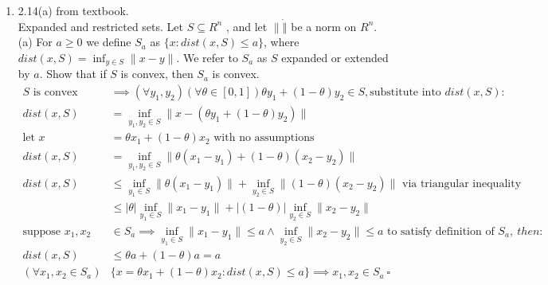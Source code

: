 \documentclass[12pt,letter]{article}
\newcommand{\norm}[1]{\|#1\|}
\newcommand{\set}[1]{\{#1\}}
\begin{document}
\begin{enumerate}
\item 2.14(a) from textbook.\\
  Expanded and restricted sets. Let $S \subseteq R^n$ , and let $\norm{\dot}$ be a norm on $R^n$.\\
  (a) For $a \geq 0$ we define $S_a$ as $\{x : dist(x, S) \leq a\}$, where $dist(x, S) = \inf_{y\in S} \norm{x-y}$. We refer to $S_a$ as $S$ expanded or extended by $a$. Show that if $S$ is convex, then $S_a$ is convex.
  \begin{align*}
    S \text{ is convex} &\implies (\forall y_1, y_2) (\forall \theta \in [0,1]) \theta y_1 + (1-\theta) y_2 \in S, \text{substitute into }dist(x,S):\\
    dist(x,S) &= \inf_{y_1,y_2 \in S} \norm{x-(\theta y_1 + (1-\theta) y_2)}\\
    \text{let } x &= \theta x_1 + (1-\theta) x_2 \text{ with no assumptions}\\
    dist(x,S) &= \inf_{y_1,y_2 \in S} \norm{\theta(x_1-y_1) + (1-\theta)(x_2-y_2)}\\
    dist(x,S) &\leq \inf_{y_1\in S}\norm{\theta(x_1-y_1)} + \inf_{y_2 \in S}\norm{(1-\theta)(x_2-y_2)} \text{ via triangular inequality}\\
                        &\leq |\theta| \inf_{y_1\in S}\norm{x_1-y_1} + |(1-\theta)|\inf_{y_2 \in S}\norm{x_2-y_2}\\
    \text{suppose } x_1, x_2 & \in S_a \implies \inf_{y_1\in S}\norm{x_1-y_1} \leq a \wedge \inf_{y_2 \in S}\norm{x_2-y_2} \leq a \text{ to satisfy definition of }S_a,\ then:\\
    dist(x,S) &\leq \theta a + (1-\theta)a=a\\
    (\forall x_1, x_2 \in S_a) & \set{x= \theta x_1 + (1-\theta) x_2 : dist(x, S) \leq a} \implies x_1, x_2 \in S_a\ \square
  \end{align*}
  
  \pagebreak
  

\end{enumerate}
\end{document}

